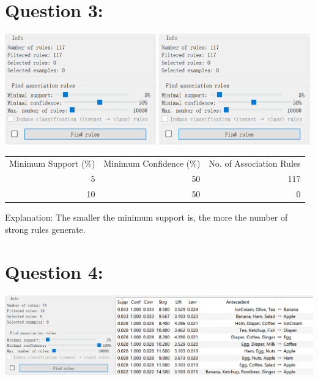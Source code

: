 \documentclass[titlepage]{article}
\begin{document}
\section{Question 3:}
\label{sec:org68129fc}
\begin{center}
\includegraphics[width=0.49\textwidth]{minsup5_mincon50.png}
\includegraphics[width=0.49\textwidth]{minsup5_mincon50.png}
\end{center}

\begin{center}
\begin{tabular}{rrr}
\hline
Minimum Support (\%) & Minimum Confidence (\%) & No. of Association Rules\\
5 & 50 & 117\\
10 & 50 & 0\\
\hline
\end{tabular}
\end{center}

Explanation: The smaller the minimum support is, the more the number of strong rules generate.

\section{Question 4:}
\label{sec:org61a17b8}
\begin{center}
\begin{center}
\includegraphics[width=.9\linewidth]{mincon100_3.png}
\end{center}
\end{center}
\end{document}
